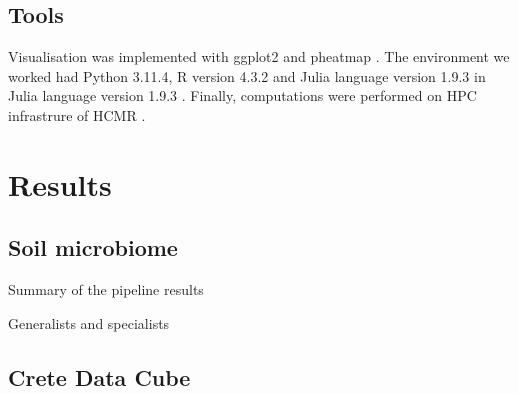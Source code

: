 \documentclass[unnumsec,webpdf,contemporary,large]{oup-authoring-template}%
\theoremstyle{thmstyleone}%
\theoremstyle{thmstyletwo}%
\theoremstyle{thmstylethree}%
\begin{document}
\subsection{Tools}\label{Coding environment}

Visualisation was implemented with ggplot2 \cite{ggplot22016} and pheatmap \cite{Kolde2019}.
The environment we worked had Python 3.11.4, R version 4.3.2 \cite{rcoreteam}
and Julia language version 1.9.3 \cite{Julia-2017}in Julia language version 1.9.3 \cite{Julia-2017}.
Finally, computations were performed on HPC infrastrure of HCMR \cite{Zafeiropoulos2021}.

\section{Results}\label{results}

\subsection{Soil microbiome}\label{soil_microbiome}

Summary of the pipeline results

Generalists and specialists


\subsection{Crete Data Cube}\label{data_cube}
\end{document}
